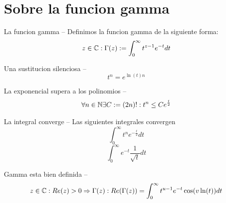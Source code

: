 \section{Sobre la funcion gamma}
\begin{Definition}{La funcion gamma}
    -- Definimos la funcion gamma de la siguiente forma:
    $$ z \in \mathbb{C} : \Gamma(z) := \int_{0}^{\infty} t^{z-1}e^{-t} dt $$
\end{Definition}

\begin{Proposition}{Una sustitucion silenciosa}
    -- $$ t^{n} = e^{\ln(t)n} $$
\end{Proposition}

\begin{Proposition}{La exponencial supera a los polinomios}
    -- $$ \forall n \in \mathbb{N} \exists C := (2n)! : t^{n} \leq C e^{\frac{t}{2}}$$
\end{Proposition}

\begin{Proposition}{La integral converge}
    -- Las siguientes integrales convergen
    $$ \int_{0}^{\infty} t^{n} e^{-\frac{t}{2}} dt $$
    $$ \int_{0}^{\infty} e^{-t} \frac{1}{\sqrt{t}} dt $$
\end{Proposition}

\begin{Proposition}{Gamma esta bien definida}
    -- $$ z \in \mathbb{C}: Re(z) > 0 \Rightarrow \Gamma(z) : Re(\Gamma(z)) = \int_{0}^{\infty} t^{u-1} e^{-t} \cos(v \ln(t)) dt $$
\end{Proposition}

